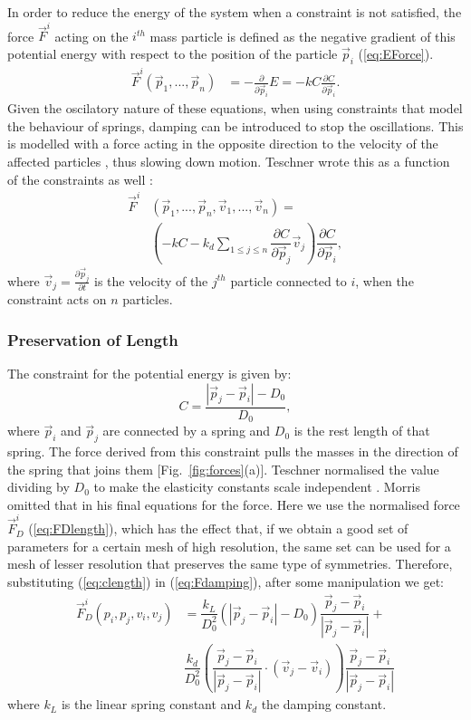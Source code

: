 \documentclass[journal]{IEEEtran}
\newcommand{\eref}[1]{(\ref{#1})}
\newcommand{\fref}[1]{Fig.~\ref{#1}}
\newcommand{\comment}[1]{{\color{red} #1}}
\begin{document}
In order to reduce the energy of the system when a constraint is not satisfied, the force $\vec{F}^i$ acting on the $i^{th}$ mass particle is defined as the negative gradient of this potential energy with respect to the position of the particle $\vec{p}_i$ \eref{eq:EForce}.
\begin{align}
 \vec{F}^i(\vec{p}_1,...,\vec{p}_{n}) & = -\frac{\partial}{\partial \vec{p}_i}E = -kC\frac{\partial C}{\partial \vec{p}_i}. \label{eq:EForce}
\end{align}
Given the oscilatory nature of these equations, \comment{when using constraints that model the behaviour of springs,} damping can be introduced to stop the oscillations.  This is modelled with a force acting in the opposite direction to the velocity of the affected particles\comment{, thus slowing down motion.  Teschner wrote this as a function of the constraints as well \cite{Teschner2004}}:
\begin{align}
 \label{eq:Fdamping}
 \vec{F}^i&(\vec{p}_1,...,\vec{p}_{n},\vec{v}_1,...,\vec{v}_{n}) = \nonumber \\
    &\left( -kC-k_d\sum_{1 \le j \le n} \dfrac{\partial C}{\partial \vec{p}_j}\vec{v}_j \right)
 \dfrac{\partial C}{\partial \vec{p}_i},
\end{align}
where $\vec{v}_j = \frac{\partial \vec{p}_j}{\partial t}$ is the velocity of the $j^{th}$ particle connected to $i$, when the constraint acts on $n$ particles.

\subsubsection{Preservation of Length}
The constraint for the potential energy is given by:
\begin{equation}
 C = \dfrac{|\vec{p}_j-\vec{p}_i|-D_0}{D_0}, \label{eq:clength}
\end{equation}
where $\vec{p}_i$ and $\vec{p}_j$ are connected by a spring and $D_0$ is the rest length of that spring.  The force derived from this constraint pulls the masses in the direction of the spring that joins them [\fref{fig:forces}(a)].  Teschner normalised the value dividing by $D_0$ to make the elasticity constants scale independent \cite{Teschner2004}.  Morris \cite{Morris2008} omitted that in his final equations for the force.  Here we use the normalised force $\vec{F}^i_D$ \eref{eq:FDlength}, which has the effect that, if we obtain a good set of parameters for a certain mesh of high resolution, the same set can be used for a mesh of lesser resolution that preserves the same type of symmetries.  Therefore, substituting \eref{eq:clength} in \eref{eq:Fdamping}, after some manipulation we get:
\begin{align}
 \vec{F}^i_D(p_i,p_j,v_i,v_j) &= \dfrac{k_L}{D_0^2} \left( |\vec{p}_j-\vec{p}_i|-D_0 \right) \dfrac{\vec{p}_j-\vec{p}_i}{|\vec{p}_j-\vec{p}_i|}  + \nonumber \\
 & \dfrac{k_d}{D_0^2}\left( \dfrac{\vec{p}_j-\vec{p}_i}{|\vec{p}_j-\vec{p}_i|} \cdot (\vec{v}_j-\vec{v}_i) \right) \dfrac{\vec{p}_j-\vec{p}_i}{|\vec{p}_j-\vec{p}_i|} \label{eq:FDlength}
\end{align}
where $k_L$ is the linear spring constant and $k_d$ the damping constant.
\end{document}

